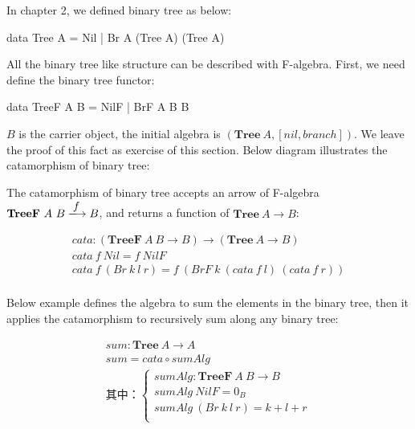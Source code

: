 \documentclass[b5paper]{article}
\begin{document}
\begin{example}
\normalfont
In chapter 2, we defined binary tree as below:

\begin{Haskell}[frame = none]
data Tree A = Nil | Br A (Tree A) (Tree A)
\end{Haskell}

All the binary tree like structure can be described with F-algebra. First, we need define the binary tree functor:

\begin{Haskell}[frame = none]
data TreeF A B = NilF | BrF A B B
\end{Haskell}

$B$ is the carrier object, the initial algebra is $(\mathbf{Tree}\ A, [nil, branch])$. We leave the proof of this fact as exercise of this section. Below diagram illustrates the catamorphism of binary tree:

\begin{center}
\end{center}

The catamorphism of binary tree accepts an arrow of F-algebra $\mathbf{TreeF}\ A\ B \arrowto{f} B$, and returns a function of $\mathbf{Tree}\ A \to B$:

\[
\begin{array}{l}
cata : (\mathbf{TreeF}\ A\ B \to B) \to (\mathbf{Tree}\ A \to B) \\
cata\ f\ Nil = f\ NilF \\
cata\ f\ (Br\ k\ l\ r) =f\ (BrF\ k\ (cata\ f\ l)\ (cata\ f\ r)) \\
\end{array}
\]

Below example defines the algebra to sum the elements in the binary tree, then it applies the catamorphism to recursively sum along any binary tree:

\[
\begin{array}{l}
sum : \mathbf{Tree}\ A \to A \\
sum = cata \circ sumAlg \\
\text{其中：}
      \begin{cases}
        sumAlg : \mathbf{TreeF}\ A\ B \to B \\
        sumAlg\ NilF = 0_{B} \\
        sumAlg\ (Br\ k\ l\ r) = k + l + r \\
      \end{cases} \\
\end{array}
\]


\end{example}
\end{document}
